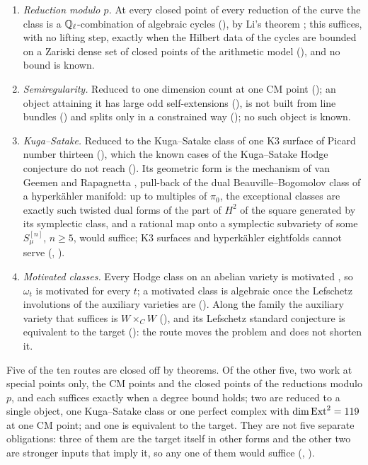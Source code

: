 \begin{remark}
\begin{enumerate}[label=\textup{(\arabic*)},leftmargin=2.6em,itemsep=2pt]
  Rosati-fixed algebra $K_{c}^{+}$, all of it; the Weil structure of the
  fourfold, with which Markman's theorem produces its cycles, reaches $110$
  of the $132$ Hodge classes and none of the exceptional ones
  (, ).
\item \emph{Reduction modulo $p$.} At every closed point of every reduction
  of the curve the class is a $\mathbb{Q}_{\ell}$-combination of algebraic cycles
  (), by Li's theorem \cite[Theorem~1.1]{Li26}; this
  suffices, with no lifting step, exactly when the Hilbert data of the cycles
  are bounded on a Zariski dense set of closed points of the arithmetic model
  (), and no bound is known.
\item \emph{Semiregularity.} Reduced to one dimension count at one CM point
  (); an object attaining it has large odd
  self-extensions (), is not built from line
  bundles () and splits only in a constrained way
  (); no such object is known.
\item \emph{Kuga--Satake.} Reduced to the Kuga--Satake class of one K3 surface
  of Picard number thirteen (), which the known cases of
  the Kuga--Satake Hodge conjecture do not reach (). Its
  geometric form is the mechanism of van Geemen and Rapagnetta \cite{vGR26},
  pull-back of the dual Beauville--Bogomolov class of a hyperk\"ahler
  manifold: up to multiples of $\pi_{0}$, the exceptional classes are exactly
  such twisted dual forms of the part of $H^{2}$ of the square generated by
  its symplectic class, and a rational map onto a
  symplectic subvariety of some $S_{\mu}^{[n]}$, $n\ge5$, would suffice;
  K3 surfaces and hyperk\"ahler eightfolds cannot serve
  (, ).
\item \emph{Motivated classes.} Every Hodge class on an abelian variety is
  motivated \cite[Th\'eor\`eme~0.6.2]{And96b}, so $\omega_{t}$ is motivated for
  every $t$; a motivated class is algebraic once the Lefschetz involutions of
  the auxiliary varieties are (). Along the family the
  auxiliary variety that suffices is $W\times_{C}W$
  (), and its Lefschetz standard conjecture is
  equivalent to the target (): the route moves the
  problem and does not shorten it.
\end{enumerate}
Five of the ten routes are closed off by theorems. Of the other five, two
work at special points only, the CM points and the closed points of the
reductions modulo $p$, and each suffices exactly when a degree bound holds;
two are reduced to a single object, one Kuga--Satake class or one perfect
complex with $\dim\operatorname{Ext}^{2}=119$ at one CM point; and one is equivalent to the
target. They are not five separate obligations: three of them are the target itself
in other forms and the other two are stronger inputs that imply it, so any
one of them would suffice (, ).
\end{remark}

